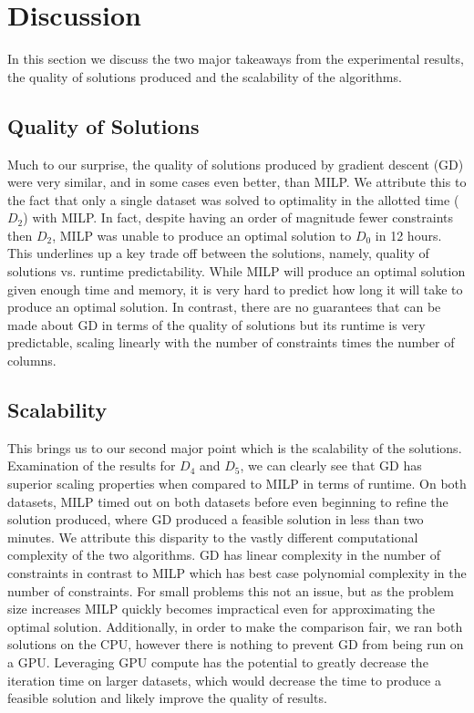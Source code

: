 \documentclass[a4paper]{article}
\begin{document}
\section{Discussion}

In this section we discuss the two major takeaways from the experimental results,
the quality of solutions produced and the scalability of the algorithms.

\subsection{Quality of Solutions}

Much to our surprise, the quality of solutions produced by gradient descent
(GD) were very similar, and in some cases even better, than MILP. We attribute this
to the fact that only a single dataset was solved to optimality in the 
allotted time ($D_2$) with MILP.  In fact, despite having an order of magnitude 
fewer constraints then $D_2$, MILP was unable to produce an optimal solution to $D_0$ 
in 12 hours.  This underlines up a key trade off
between the solutions, namely, quality of solutions vs. runtime predictability.
While MILP will produce an optimal solution given enough time and memory, it is
very hard to predict how long it will take to produce an optimal solution. 
In contrast, there are no guarantees that can be made about GD in terms of
the quality of solutions but its runtime is very predictable, scaling
linearly with the number of constraints times the number of columns. 

\subsection{Scalability}

This brings us to our second major point which is the scalability of the
solutions. Examination of the results for $D_4$ and $D_5$, we can clearly see
that GD has superior scaling properties when compared to MILP in terms of
runtime. On both datasets, MILP timed out on both datasets before even
beginning to refine the solution produced, where GD produced a feasible
solution in less than two minutes.  We attribute this disparity to the vastly
different computational complexity of the two algorithms. GD has linear
complexity in the number of constraints in contrast to MILP which has best case
polynomial complexity in the number of constraints. For small problems this not
an issue, but as the problem size increases MILP quickly becomes impractical
even for approximating the optimal solution. Additionally, in order to make the
comparison fair, we ran both solutions on the CPU, however there is nothing to
prevent GD from being run on a GPU. Leveraging GPU compute has the potential to
greatly decrease the iteration time on larger datasets, which would decrease
the time to produce a feasible solution and likely improve the quality of
results.
\end{document}
